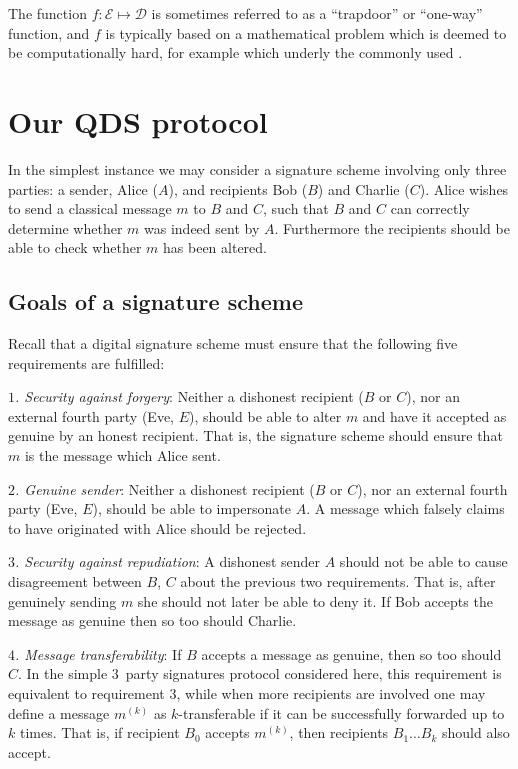 The function $f: \mathcal{E} \mapsto \mathcal{D}$ is sometimes referred to as a ``trapdoor'' or ``one-way'' function, and $f$ is typically based on a mathematical problem which is deemed to be computationally hard, for example  which underly the commonly used . 


\section{Our QDS protocol}

In the simplest instance we may consider a signature scheme involving only three parties: a sender, Alice ($A$), and recipients Bob ($B$) and Charlie ($C$). Alice wishes to send a classical message $m$ to $B$ and $C$, such that $B$ and $C$ can correctly determine whether $m$ was indeed sent by $A$. Furthermore the recipients should be able to check whether $m$ has been altered.

\subsection{Goals of a signature scheme}

Recall that a digital signature scheme must ensure that the following five requirements are fulfilled:

\noindent \emph{$1$. Security against forgery}: Neither a dishonest recipient ($B$ or $C$), nor an external fourth party (Eve, $E$), should be able to alter $m$ and have it accepted as genuine by an honest recipient. That is, the signature scheme should ensure that $m$ is the message which Alice sent.

\noindent \emph{$2$. Genuine sender}: Neither a dishonest recipient ($B$ or $C$), nor an external fourth party (Eve, $E$), should be able to impersonate $A$. A message which falsely claims to have originated with Alice should be rejected.

\noindent \emph{$3$. Security against repudiation}: A dishonest sender $A$ should not be able to cause disagreement between $B$, $C$ about the previous two requirements. That is, after genuinely sending $m$ she should not later be able to deny it. If Bob accepts the message as genuine then so too should Charlie. 

\noindent \emph{$4$. Message transferability}: If $B$ accepts a message as genuine, then so too should $C$. In the simple $3$~party signatures protocol considered here, this requirement is equivalent to requirement $3$, while when more recipients are involved one may define a message $m^{\left(k\right)}$ as $k$-transferable if it can be successfully forwarded up to $k$ times. That is, if recipient $B_0$ accepts $m^{\left(k\right)}$, then recipients $B_1 \dots B_k$ should also accept.

